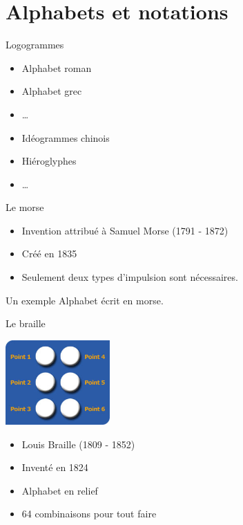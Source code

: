 \documentclass{beamer}
\begin{document}
\section[Alphabets]{Alphabets et notations}

\begin{frame}
  {\Huge Logogrammes}
  \begin{itemize}
  \item Alphabet roman
  \item Alphabet grec
  \item \dots
  \end{itemize}
  \begin{itemize}
  \item Idéogrammes chinois
  \item Hiéroglyphes
  \item \dots
  \end{itemize}
\end{frame}

\begin{frame}
  {\Huge Le morse}
  \begin{itemize}
  \item Invention attribué à Samuel Morse (1791 - 1872)
  \item Créé en 1835
  \item Seulement deux types d'impulsion sont nécessaires.
  \end{itemize}
  
  Un exemple Alphabet écrit en morse.
\end{frame}


\begin{frame}  
  \Huge{Le braille}
  \begin{center}
  \includegraphics[width=4cm]{./include/cellule_braille.jpg}
  \end{center}
  \normalsize \begin{itemize}
  \item Louis Braille (1809 - 1852)
  \item Inventé en 1824
  \item Alphabet en relief
  \item 64 combinaisons pour tout faire
  \end{itemize}
\end{frame}
\end{document}
